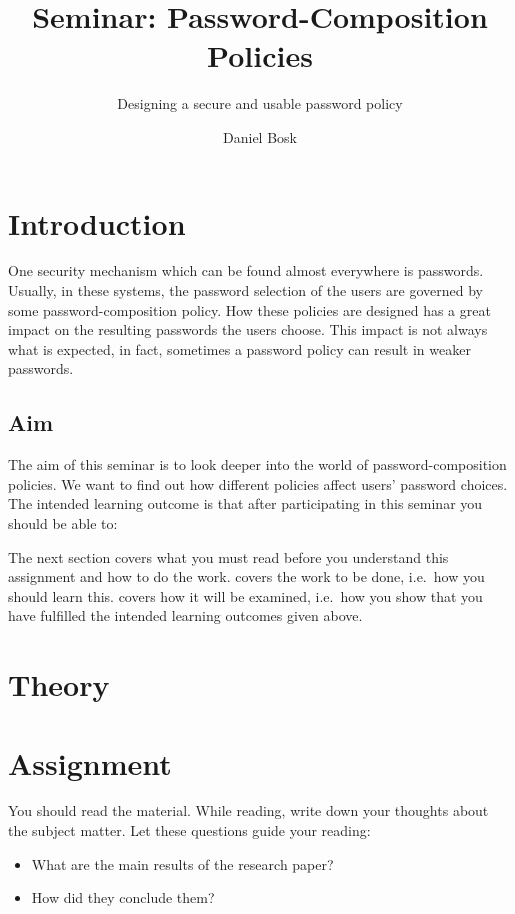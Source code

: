 \title{Seminar: Password-Composition Policies}
\subtitle{Designing a secure and usable password policy}

\author{%
  Daniel Bosk
}

\maketitle


\section{Introduction}
\label{sec:intro}
One security mechanism which can be found almost everywhere is passwords.
Usually, in these systems, the password selection of the users are governed by 
some password-composition policy.
How these policies are designed has a great impact on the resulting passwords 
the users choose.
This impact is not always what is expected, in fact, sometimes a password 
policy can result in weaker passwords.

\subsection{Aim}
\label{sec:Syfte}
The aim of this seminar is to look deeper into the world of 
password-composition policies.
We want to find out how different policies affect users' password choices.
The intended learning outcome is that after participating in this seminar you 
should be able to:
\begin{itemize}
	
\end{itemize}

The next section covers what you must read before you understand this 
assignment and how to do the work.
 covers the work to be done, i.e.~how you should learn this.
 covers how it will be examined, i.e.~how you show that you have 
fulfilled the intended learning outcomes given above.


\section{Theory}
\label{sec:theory}



\section{Assignment}
\label{sec:tasks}
You should read the material.
While reading, write down your thoughts about the subject matter.
Let these questions guide your reading:
\begin{itemize}
  \item What are the main results of the research paper?
  \item How did they conclude them?
\end{itemize}

